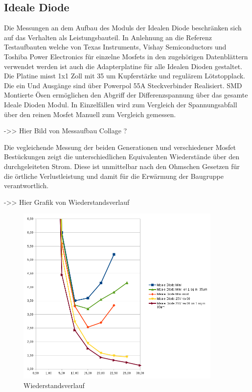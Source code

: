 \subsection{Ideale Diode}

Die Messungen an dem Aufbau des Moduls der Idealen Diode beschränken sich auf das Verhalten als Leistungsbauteil. 
In Anlehnung an die Referenz Testaufbauten welche von Texas Instruments, Vishay Semiconductors und Toshiba Power Electronics für einzelne Mosfets in den zugehörigen Datenblättern verwendet werden ist auch die Adapterplatine für alle Idealen Dioden gestaltet.
Die Platine misst 1x1 Zoll mit 35 um Kupferstärke und regulärem Lötstopplack. Die ein Und Ausgänge sind über Powerpol 55A Steckverbinder Realisiert. SMD Montierte Ösen ermöglichen den Abgriff der Differenzspannung über das gesamte Ideale Dioden Modul. In Einzelfällen wird zum Vergleich der Spannungsabfall über den reinen Mosfet Manuell zum Vergleich gemessen.

->> Hier Bild von Messaufbau  Collage ?


Die vegleichende Messung der beiden Generationen und verschiedener Mosfet Bestückungen zeigt die unterschiedlichen Equivalenten Wiederstände über den durchgeleiteten Strom.
Diese ist unmittelbar nach den Ohmschen Gesetzen für die örtliche Verlustleistung und damit für die Erwärmung der Baugruppe verantwortlich.


->> Hier Grafik von Wiederstandsverlauf


\begin{figure}[H]
\centering
\includegraphics[width=0.9\textwidth]{graphen/Wiederstand-Strom-Ideale_Diode_ver00} 
\caption{Wiederstandsverlauf} 
\label{fig:Wiederstandsverlauf}
\end{figure}


